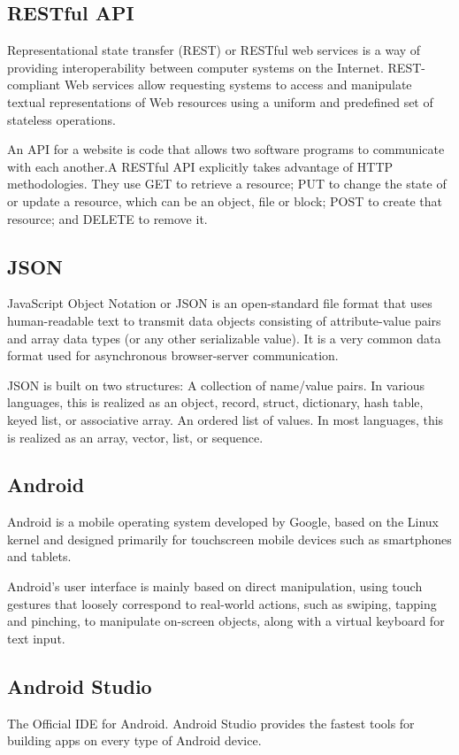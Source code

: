 \documentclass[BTech]{srmuthesis}
\begin{document}
\subsection{RESTful API}
Representational state transfer (REST) or RESTful web services is a way of providing interoperability between computer systems on the Internet. REST-compliant Web services allow requesting systems to access and manipulate textual representations of Web resources using a uniform and predefined set of stateless operations.

An API for a website is code that allows two software programs to communicate with each another.A RESTful API explicitly takes advantage of HTTP methodologies. They use GET to retrieve a resource; PUT to change the state of or update a resource, which can be an object, file or block; POST to create that resource; and DELETE to remove it.
\subsection{JSON}
JavaScript Object Notation or JSON is an open-standard file format that uses human-readable text to transmit data objects consisting of attribute-value pairs and array data types (or any other serializable value). It is a very common data format used for asynchronous browser-server communication.

JSON is built on two structures:
A collection of name/value pairs. In various languages, this is realized as an object, record, struct, dictionary, hash table, keyed list, or associative array.
An ordered list of values. In most languages, this is realized as an array, vector, list, or sequence.
\subsection{Android}
Android is a mobile operating system developed by Google, based on the Linux kernel and designed primarily for touchscreen mobile devices such as smartphones and tablets.

Android's user interface is mainly based on direct manipulation, using touch gestures that loosely correspond to real-world actions, such as swiping, tapping and pinching, to manipulate on-screen objects, along with a virtual keyboard for text input. 
\subsection{Android Studio}
The Official IDE for Android. Android Studio provides the fastest tools for building apps on every type of Android device.
\end{document}
